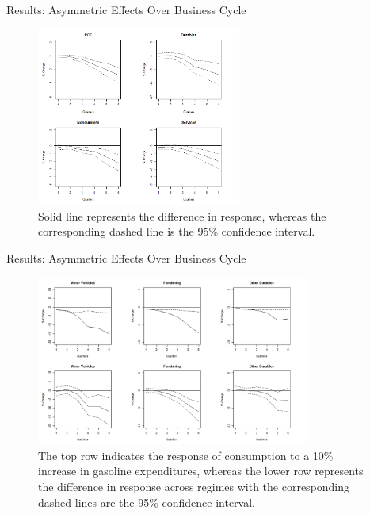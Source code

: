 \documentclass[
  10pt,
  ignorenonframetext,
]{beamer}
\begin{document}
\begin{frame}{Results: Asymmetric Effects Over Business Cycle}
\protect\hypertarget{results-asymmetric-effects-over-business-cycle-2}{}

\begin{figure}
\centering
\includegraphics[width=0.6\textwidth,height=\textheight]{Difference - Aggregated.png}
\caption{Solid line represents the difference in response, whereas the
corresponding dashed line is the 95\% confidence interval.}
\end{figure}

\end{frame}

\begin{frame}{Results: Asymmetric Effects Over Business Cycle}
\protect\hypertarget{results-asymmetric-effects-over-business-cycle-3}{}

\begin{figure}
\centering
\includegraphics[width=0.8\textwidth,height=\textheight]{Asymmetry - 1.jpeg}
\caption{The top row indicates the response of consumption to a 10\%
increase in gasoline expenditures, whereas the lower row represents the
difference in response across regimes with the corresponding dashed
lines are the 95\% confidence interval.}
\end{figure}

\end{frame}
\end{document}
